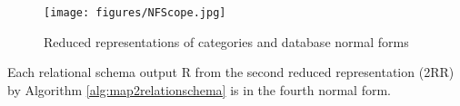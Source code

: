 
\begin{figure}
\centering
\texttt{[image: figures/NFScope.jpg]}
\caption{Reduced representations of categories and database normal forms} \label{fig:NFScope}
\end{figure}





\begin{theorem} Each relational schema output R from the second reduced representation (2RR) by Algorithm \ref{alg:map2relationschema} is in the fourth normal form. \label{the:4NF}
\end{theorem}




